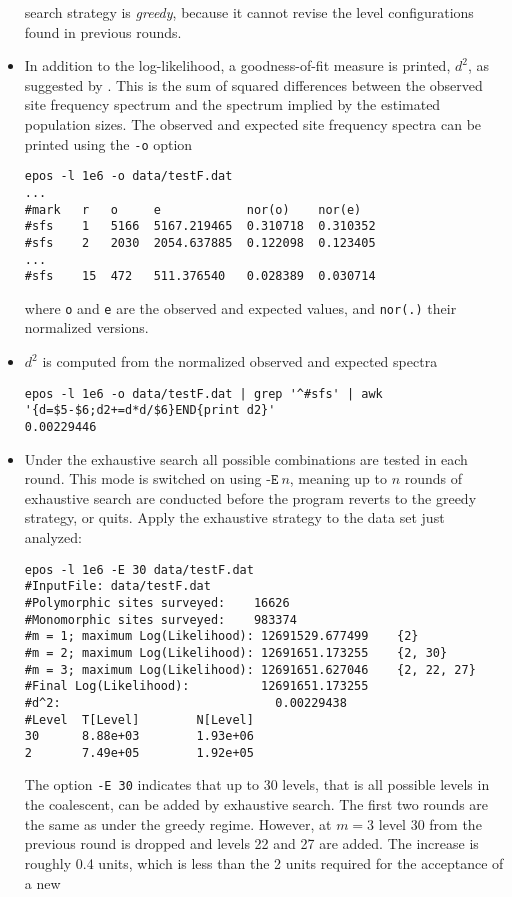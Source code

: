 \documentclass[a4paper, english]{article}
\newcommand{\ty}{\texttt}
\begin{document}
\begin{itemize}
search strategy is \emph{greedy}, because it cannot revise the level
configurations found in previous rounds.
\item In addition to the log-likelihood, a goodness-of-fit measure is
  printed, $d^2$, as suggested by \cite{lap17:acc}. This is the sum of
  squared differences between the observed site frequency spectrum and
  the spectrum implied by the estimated population sizes. The observed
  and expected site frequency spectra can be printed using the \ty{-o}
  option
\begin{verbatim}
epos -l 1e6 -o data/testF.dat 
...
#mark   r   o     e            nor(o)    nor(e)
#sfs    1   5166  5167.219465  0.310718  0.310352
#sfs	2   2030  2054.637885  0.122098  0.123405
...
#sfs    15  472   511.376540   0.028389  0.030714
\end{verbatim}
where \ty{o} and \ty{e} are the observed and expected values, and
\ty{nor(.)} their normalized versions.
\item $d^2$ is computed from the normalized observed and expected
  spectra
\begin{verbatim}
epos -l 1e6 -o data/testF.dat | grep '^#sfs' | awk '{d=$5-$6;d2+=d*d/$6}END{print d2}'
0.00229446
\end{verbatim}
\item Under the exhaustive search all possible combinations are tested in each
round. This mode is switched on using $\ty{-E}\ n$, meaning up to $n$
rounds of exhaustive search are conducted before the program reverts
to the greedy strategy, or quits. Apply the exhaustive strategy to the
data set just analyzed:
\begin{verbatim}
epos -l 1e6 -E 30 data/testF.dat 
#InputFile:	data/testF.dat
#Polymorphic sites surveyed:	16626
#Monomorphic sites surveyed:	983374
#m = 1; maximum Log(Likelihood): 12691529.677499	{2}
#m = 2; maximum Log(Likelihood): 12691651.173255	{2, 30}
#m = 3; maximum Log(Likelihood): 12691651.627046	{2, 22, 27}
#Final Log(Likelihood):          12691651.173255
#d^2:                              0.00229438
#Level  T[Level]        N[Level]
30      8.88e+03        1.93e+06
2       7.49e+05        1.92e+05
\end{verbatim}
The option \ty{-E 30} indicates that up to 30 levels, that is all
possible levels in the coalescent, can be added by exhaustive
search. The first two rounds are the same as under the greedy
regime. However, at $m=3$ level 30 from the previous round is dropped
and levels 22 and 27 are added. The increase is roughly 0.4 units,
which is less than the 2 units required for the acceptance of a new

\end{itemize}
\end{document}
